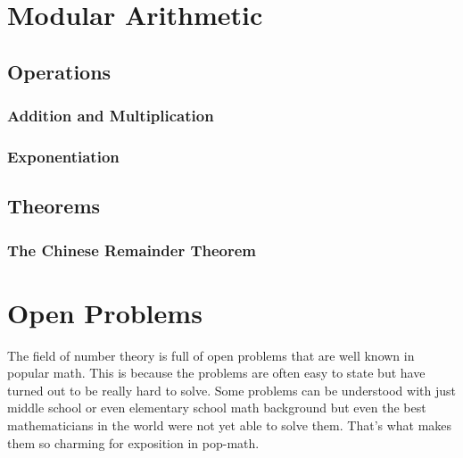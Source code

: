 \section{Modular Arithmetic}



\subsection{Operations}

\subsubsection{Addition and Multiplication}

\subsubsection{Exponentiation}


\subsection{Theorems}


\subsubsection{The Chinese Remainder Theorem}



\section{Open Problems}
The field of number theory is full of open problems that are well known in popular math. This is because the problems are often easy to state but have turned out to be really hard to solve. Some problems can be understood with just middle school or even elementary school math background but even the best mathematicians in the world were not yet able to solve them. That's what makes them so charming for exposition in pop-math.

